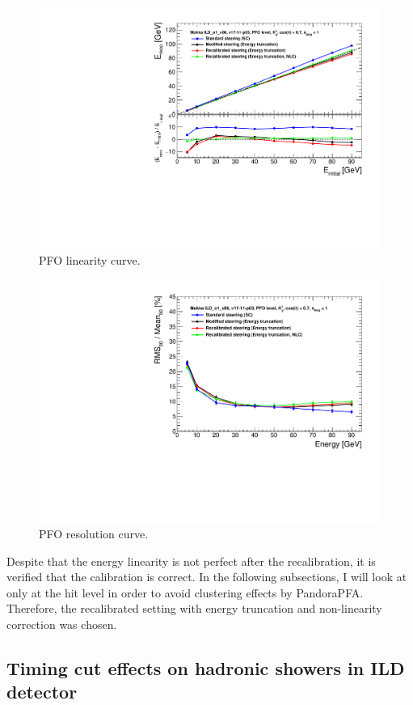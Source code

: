 \begin{figure}[htbp!]
  \centering
  \includegraphics[width=0.7\linewidth]{../Thesis_Plots/ILD/NoSmearing/Plots_Comparison/Comparison_linearity_Curves_PFO}
  \caption{PFO linearity curve.} \label{fig:linpfo}
\end{figure}

\begin{figure}[htbp!]
  \centering
  \includegraphics[width=0.7\linewidth]{../Thesis_Plots/ILD/NoSmearing/Plots_Comparison/Comparison_resolution_Curves_PFO}
  \caption{PFO resolution curve.} \label{fig:resopfo}
\end{figure}

Despite that the energy linearity is not perfect after the recalibration, it is verified that the calibration is correct. In the following subsections, I will look at only at the hit level in order to avoid clustering effects by PandoraPFA. Therefore, the recalibrated setting with energy truncation and non-linearity correction was chosen.

\subsection{Timing cut effects on hadronic showers in ILD detector}

